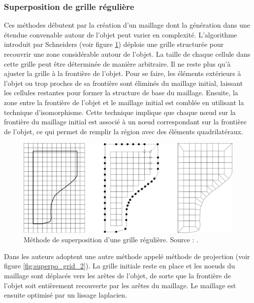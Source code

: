 \subsubsection{Superposition de grille régulière}

Ces méthodes débutent par la création d'un maillage dont la génération dans une étendue convenable autour de l'objet peut varier en complexité. L'algorithme introduit par Schneiders \cite{schneiders1996grid} (voir figure \ref{fig:superpo_grid_1}) déploie une grille structurée pour recouvrir une zone considérable autour de l'objet. La taille de chaque cellule dans cette grille peut être déterminée de manière arbitraire. Il ne reste plus qu'à ajuster la grille à la frontière de l'objet. Pour se faire, les éléments extérieurs à l'objet ou trop proches de sa frontière sont éliminés du maillage initial, laissant les cellules restantes pour former la structure de base du maillage. Ensuite, la zone entre la frontière de l'objet et le maillage initial est comblée en utilisant la technique d'isomorphisme. Cette technique implique que chaque nœud sur la frontière du maillage initial est associé à un nœud correspondant sur la frontière de l'objet, ce qui permet de remplir la région avec des éléments quadrilatéraux.

 \begin{figure}[!h]
    \centering
    \includegraphics[scale=0.445]{images/superpo_grid_1.png}
    \caption{Méthode de superposition d'une grille régulière. Source : \cite{schneiders1996grid}.}
    \label{fig:superpo_grid_1}
\end{figure}

Dans \cite{taghavi1994automatic, ives1995geometric} les auteurs adoptent une autre méthode appelé méthode de projection  (voir figure \ref{fig:superpo_grid_2}). La grille initiale reste en place et les noeuds du maillage sont déplacés vers les arêtes de l'objet, de sorte que la frontière de l'objet soit entièrement recouverte par les arêtes du maillage. Le maillage est ensuite optimisé par un lissage laplacien.

